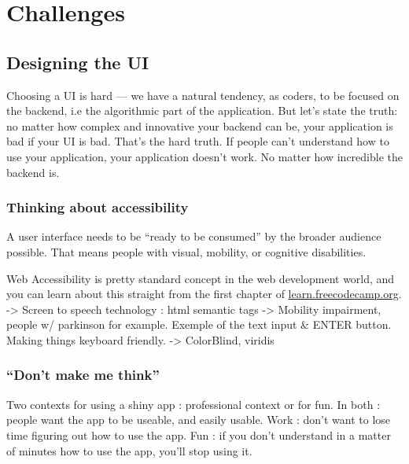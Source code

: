 \documentclass[]{book}
\begin{document}
\hypertarget{challenges}{%
\chapter{Challenges}\label{challenges}}

\hypertarget{designing-the-ui}{%
\section{Designing the UI}\label{designing-the-ui}}

Choosing a UI is hard --- we have a natural tendency, as coders, to be focused on the backend, i.e the algorithmic part of the application. But let's state the truth: no matter how complex and innovative your backend can be, your application is bad if your UI is bad. That's the hard truth. If people can't understand how to use your application, your application doesn't work. No matter how incredible the backend is.

\hypertarget{thinking-about-accessibility}{%
\subsection{Thinking about accessibility}\label{thinking-about-accessibility}}

A user interface needs to be ``ready to be consumed'' by the broader audience possible. That means people with visual, mobility, or cognitive disabilities.

Web Accessibility is pretty standard concept in the web development world, and you can learn about this straight from the first chapter of \href{https://learn.freecodecamp.org/}{learn.freecodecamp.org}.
-\textgreater{} Screen to speech technology : html semantic tags
-\textgreater{} Mobility impairment, people w/ parkinson for example. Exemple of the text input \& ENTER button. Making things keyboard friendly.
-\textgreater{} ColorBlind, viridis

\hypertarget{dont-make-me-think}{%
\subsection{``Don't make me think''}\label{dont-make-me-think}}

Two contexts for using a shiny app : professional context or for fun. In both : people want the app to be useable, and easily usable. Work : don't want to lose time figuring out how to use the app. Fun : if you don't understand in a matter of minutes how to use the app, you'll stop using it.
\end{document}
